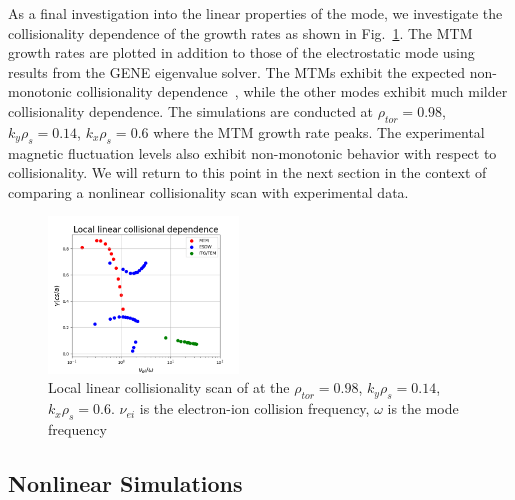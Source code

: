 \documentclass[
 aip,
 amsmath,amssymb,
 reprint
]{revtex4-1}
\begin{document}
As a final investigation into the linear properties of the mode, we investigate the collisionality dependence of the growth rates as shown in Fig.~\ref{fig:EV_nu}.  
The MTM growth rates are plotted in addition to those of the electrostatic mode using results from the GENE eigenvalue solver.  The MTMs exhibit the expected non-monotonic collisionality dependence~\cite{gladd,MTM_RH,Joel_prl}, while the other modes exhibit much milder collisionality dependence.  The simulations are conducted at $\rho_{tor}=0.98$, $k_y\rho_s=0.14$, $k_x\rho_s=0.6$ where the MTM growth rate peaks.  The experimental magnetic fluctuation levels also exhibit non-monotonic behavior with respect to collisionality.  We will return to this point in the next section in the context of comparing a nonlinear collisionality scan with experimental data.  


\begin{figure}[ht]
        \includegraphics[width=0.45\textwidth]{9.png}
        \centering
        \caption[font=5]{Local linear collisionality scan of at the $\rho_{tor}=0.98$, $k_y\rho_s=0.14$, $k_x\rho_s=0.6$. $\nu_{ei}$ is the electron-ion collision frequency, $\omega$ is the mode frequency}
        \label{fig:EV_nu}
\end{figure}

\subsection{Nonlinear Simulations}
\end{document}
